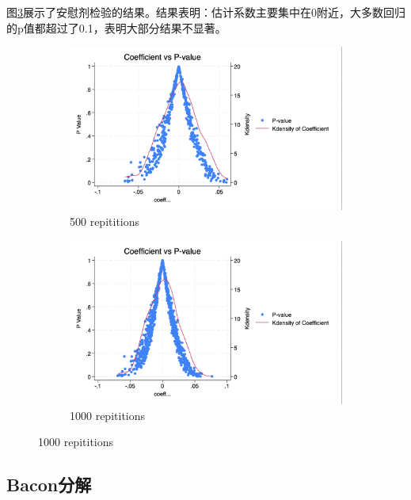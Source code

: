 \documentclass[a4paper,12pt]{article}
\begin{document}
图\ref{fig:Placebo}展示了安慰剂检验的结果。结果表明：估计系数主要集中在0附近，大多数回归的p值都超过了0.1，表明大部分结果不显著。

\begin{figure}[H]
    \centering
    \caption{不同重复次数的安慰剂检验}
    \begin{subfigure}[b]{0.45\textwidth}
        \centering
        \includegraphics[width=\textwidth]{500.png}
        \caption{500 repititions}
        \label{fig:Placebo1}
    \end{subfigure}
    \hfill
    \begin{subfigure}[b]{0.45\textwidth}
        \centering
        \includegraphics[width=\textwidth]{1000.png}
        \caption{1000 repititions}
        \label{fig:Placebo2}
    \end{subfigure}
    \label{fig:Placebo}
\end{figure}

\subsection{Bacon分解}
\end{document}
